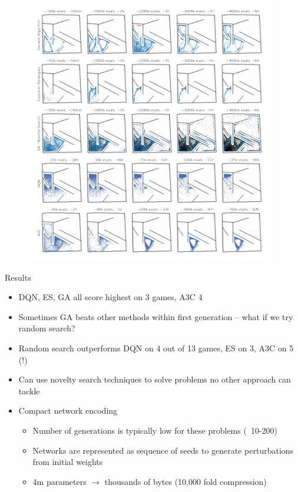 \documentclass{beamer}
\begin{document}
	\begin{frame}
		\begin{figure}
			\centering
			\includegraphics[width=.9\textheight]{ga_novelty.png}
			\label{fig4}
		\end{figure}
	\end{frame}
	
	\begin{frame}{Results}
		\begin{itemize}
			\item DQN, ES, GA all score highest on 3 games, A3C 4
			\item Sometimes GA beats other methods within first generation -- what if we try random search?
			\item Random search outperforms DQN on 4 out of 13 games, ES on 3, A3C on 5 (!)
			\item Can use novelty search techniques to solve problems no other approach can tackle
			\item Compact network encoding
			\begin{itemize}
				\item Number of generations is typically low for these problems (~10-200)
				\item Networks are represented as sequence of seeds to generate perturbations from initial weights
				\item 4m parameters $\rightarrow$ thousands of bytes (10,000 fold compression)
			\end{itemize}
		\end{itemize}
	\end{frame}
	
\end{document}
